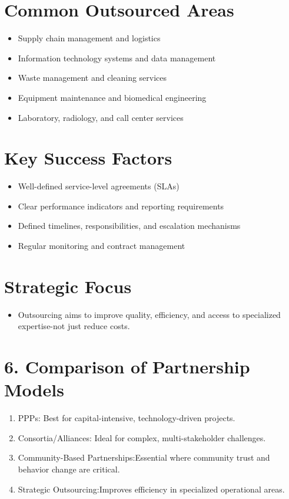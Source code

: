 \documentclass[10pt]{article}
\begin{document}
\section*{Common Outsourced Areas}
\begin{itemize}
  \item Supply chain management and logistics
  \item Information technology systems and data management
  \item Waste management and cleaning services
  \item Equipment maintenance and biomedical engineering
  \item Laboratory, radiology, and call center services
\end{itemize}

\section*{Key Success Factors}
\begin{itemize}
  \item Well-defined service-level agreements (SLAs)
  \item Clear performance indicators and reporting requirements
  \item Defined timelines, responsibilities, and escalation mechanisms
  \item Regular monitoring and contract management
\end{itemize}

\section*{Strategic Focus}
\begin{itemize}
  \item Outsourcing aims to improve quality, efficiency, and access to specialized expertise-not just reduce costs.
\end{itemize}

\section*{6. Comparison of Partnership Models}
\begin{enumerate}
  \item PPPs: Best for capital-intensive, technology-driven projects.
  \item Consortia/Alliances: Ideal for complex, multi-stakeholder challenges.
  \item Community-Based Partnerships:Essential where community trust and behavior change are critical.
  \item Strategic Outsourcing:Improves efficiency in specialized operational areas.
\end{enumerate}
\end{document}
